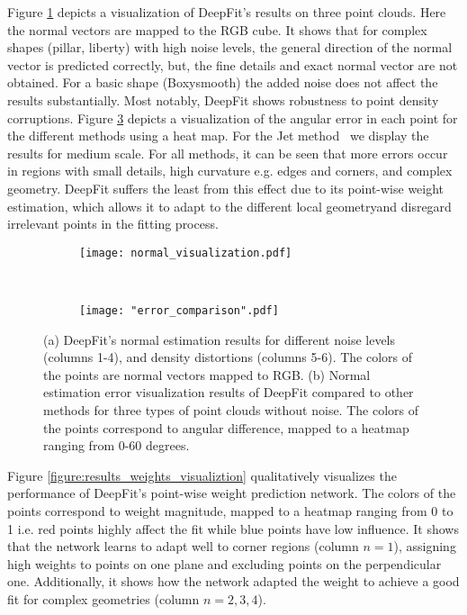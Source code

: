 Figure \ref{fig:results_normals_visualiztion:a} depicts a visualization of DeepFit's results on three point clouds. Here the normal vectors are mapped to the RGB cube. 
It shows that for complex shapes (pillar, liberty) with high noise levels, the  general direction of the normal vector is predicted correctly, but, the fine details and exact normal vector are not obtained. For a basic shape (Boxysmooth) the added noise does not affect the results substantially. Most notably, DeepFit shows robustness to point density corruptions.
Figure \ref{fig:results_normals_visualiztion:b} depicts a visualization of the angular error in each point for the different methods using a heat map. For the Jet method~\cite{cazals2005estimating} we display the results for medium scale. For all methods, it can be seen that more errors occur in regions with small details, high curvature e.g. edges and corners, and complex geometry. DeepFit suffers the least from this effect due to its point-wise weight estimation, which allows it to adapt to the different local geometryand disregard irrelevant points in the fitting process. 

\begin{figure}
\centering
    \begin{subfigure}{.48\textwidth}
        \centering
    	\texttt{[image: normal\_visualization.pdf]}
    	\caption{}
    	\label{fig:results_normals_visualiztion:a}
    \end{subfigure}
    \unskip\ \vrule\ 
    \begin{subfigure}{.48\textwidth}
        \centering
    	\texttt{[image: "error\_comparison".pdf]}
        	\caption{}
        	\label{fig:results_normals_visualiztion:b}
	\end{subfigure}
	\caption{(a) DeepFit's normal estimation results for different noise levels (columns 1-4), and density distortions (columns 5-6). The colors of the points are normal vectors mapped to RGB. (b) Normal estimation error visualization results of DeepFit compared to other methods for three types of point clouds without noise. The colors of the points correspond to angular difference, mapped to a heatmap ranging from 0-60 degrees.}
\end{figure}


Figure \ref{figure:results_weights_visualiztion} qualitatively visualizes the performance of DeepFit's point-wise weight prediction network. The colors of the points correspond to weight magnitude, mapped to a heatmap ranging from 0 to 1 i.e. red points highly affect the fit while blue points have low influence. It shows that the network learns to adapt well to corner regions (column $n=1$), assigning high weights to points on one plane and excluding points on the perpendicular one. Additionally, it shows how the network adapted the weight to achieve a good fit for complex geometries (column $n=2,3,4$). 

